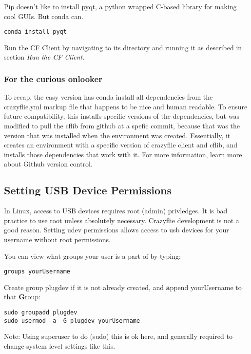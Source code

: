 \documentclass[12pt]{article}
\begin{document}
Pip doesn't like to install pyqt, a python wrapped C-based library for making cool GUIs. But conda can.
\begin{verbatim}
conda install pyqt
\end{verbatim}

Run the CF Client by navigating to its directory and running it as described in section \textit{Run the CF Client}.

\subsubsection{For the curious onlooker}
To recap, the easy version has conda install all dependencies from the crazyflie.yml markup file that happens to be nice and human readable. To ensure future compatibility, this installs specific versions of the dependencies, but was modified to pull the cflib from github at a spefic commit, because that was the version that was installed when the environment was created. Essentially, it creates an environment with a specific version of crazyflie client and cflib, and installs those dependencies that work with it. For more information, learn more about Github version control.


\subsection{Setting USB Device Permissions}
In Linux, access to USB devices requires root (admin) privledges. It is bad practice to use root unless absolutely necessary. Crazyflie development is not a good reason. Setting udev permissions allows access to usb devices for your username without root permissions.

You can view what groups your user is a part of by typing:
\begin{verbatim}
groups yourUsername
\end{verbatim}

Create group plugdev if it is not already created, and \textbf{a}ppend yourUsername to that \textbf{G}roup:
\begin{verbatim}
sudo groupadd plugdev
sudo usermod -a -G plugdev yourUsername
\end{verbatim}

Note: Using superuser to do (sudo) this is ok here, and generally required to change system level settings like this.
\end{document}
